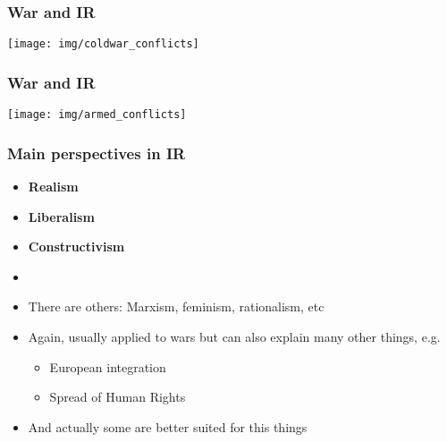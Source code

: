 \documentclass[aspectratio=43,handout]{beamer}
\begin{document}
\begin{frame}
\frametitle{War and IR}
\centering

\texttt{[image: img/coldwar\_conflicts]}

\end{frame}

\begin{frame}
\frametitle{War and IR}
\centering

\texttt{[image: img/armed\_conflicts]}

\end{frame}

\begin{frame}
\frametitle{Main perspectives in IR}
\centering

\begin{itemize}
  \item<1-> \textbf{Realism}
  \item<1-> \textbf{Liberalism}
  \item<1-> \textbf{Constructivism}
  \item[]
  \item<2-> There are others: Marxism, feminism, rationalism, etc
  \item<3-> Again, usually applied to wars but can also explain many other things, e.g.
  \begin{itemize}
    \item European integration
    \item Spread of Human Rights
  \end{itemize}
  \item<3-> And actually some are better suited for this things
\end{itemize}

\end{frame}
\end{document}
